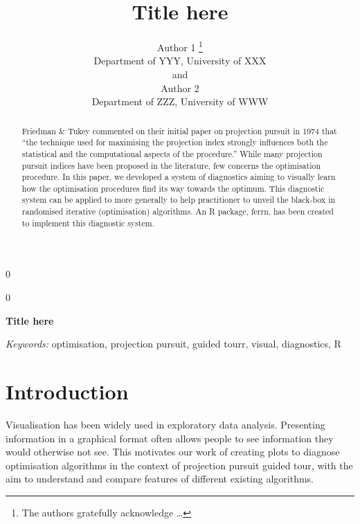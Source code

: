 \documentclass[12pt]{article}
\newcommand{\blind}{0}
\begin{document}
\def\spacingset#1{\renewcommand{\baselinestretch}%
{#1}\small\normalsize} \spacingset{1}



\blind
{
  \title{\bf Title here}

  \author{
        Author 1 \thanks{The authors gratefully acknowledge \ldots{}} \\
    Department of YYY, University of XXX\\
     and \\     Author 2 \\
    Department of ZZZ, University of WWW\\
      }
  \maketitle
} \fi

\blind
{
  \bigskip
  \bigskip
  \bigskip
  \begin{center}
    {\LARGE\bf Title here}
  \end{center}
  \medskip
} \fi

\bigskip
\begin{abstract}
Friedman \& Tukey commented on their initial paper on projection pursuit
in 1974 that ``the technique used for maximising the projection index
strongly influences both the statistical and the computational aspects
of the procedure.'' While many projection pursuit indices have been
proposed in the literature, few concerns the optimisation procedure. In
this paper, we developed a system of diagnostics aiming to visually
learn how the optimisation procedures find its way towards the optimum.
This diagnostic system can be applied to more generally to help
practitioner to unveil the black-box in randomised iterative
(optimisation) algorithms. An R package, ferrn, has been created to
implement this diagnostic system.
\end{abstract}

\noindent%
{\it Keywords:} optimisation, projection pursuit, guided tourr, visual, diagnostics, R
\vfill

\newpage
\spacingset{1.45} %

\hypertarget{introduction}{%
\section{Introduction}\label{introduction}}

Visualisation has been widely used in exploratory data analysis.
Presenting information in a graphical format often allows people to see
information they would otherwise not see. This motivates our work of
creating plots to diagnose optimisation algorithms in the context of
projection pursuit guided tour, with the aim to understand and compare
features of different existing algorithms.
\end{document}

